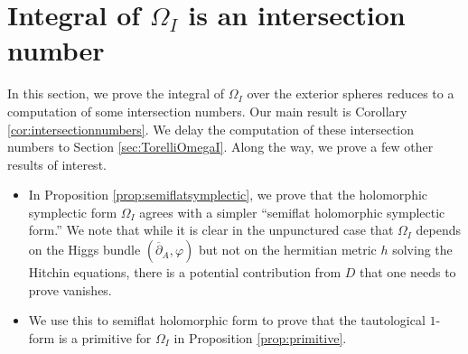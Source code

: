 \documentclass[12pt,letterpaper,reqno]{amsart}
\theoremstyle{remark}
\theoremstyle{definition}
\numberwithin{thm}{section}
\numberwithin{equation}{section}
\numberwithin{figure}{section}
\newcommand{\delbar}{\ensuremath{\overline{\partial}}}
\begin{document}
\section{Integral of \texorpdfstring{$\Omega_I$}{the holomorphic symplectic form} is an intersection number}\label{sec:integralasintersectionnumber}


In this section, we prove the integral of $\Omega_I$ over the exterior spheres reduces to a computation of some intersection numbers.  Our main result is Corollary \ref{cor:intersectionnumbers}. We delay the computation of these intersection numbers to Section \ref{sec:TorelliOmegaI}.
Along the way, we prove a few other results of interest. 
\begin{itemize}
\item In Proposition \ref{prop:semiflatsymplectic}, we prove that the holomorphic symplectic form $\Omega_I$ agrees with a simpler ``semiflat holomorphic symplectic form.'' We note that while it is clear in the unpunctured case that $\Omega_I$ depends on the Higgs bundle $(\delbar_A, \varphi)$ but not on the hermitian metric $h$ solving the Hitchin equations, there is a potential contribution from $D$ that one needs to prove vanishes.
\item 
We use this to semiflat holomorphic form to prove that the tautological $1$-form is a primitive for $\Omega_I$ in Proposition \ref{prop:primitive}.
\end{itemize}
\end{document}
